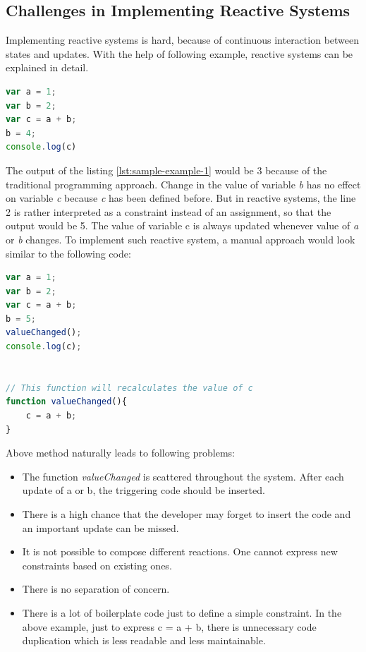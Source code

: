 \subsection {Challenges in Implementing Reactive Systems}
Implementing reactive systems is hard, because of continuous interaction between states and updates. With the help of following example, reactive systems can be explained in detail.

\begin{lstlisting}[language=JavaScript, caption=Sample example 1, label={lst:sample-example-1}]
var a = 1;
var b = 2;
var c = a + b;
b = 4;
console.log(c)
\end{lstlisting}
The output of the listing \ref{lst:sample-example-1} would be 3 because of the traditional programming approach. Change in the value of variable \textit{b} has no effect on variable \textit{c} because \textit{c} has been defined before. But in reactive systems, the line 2 is rather interpreted as a constraint instead of an assignment, so that the output would be 5. The value of variable c is always updated whenever value of \textit{a} or \textit{b} changes. 
To implement such reactive system, a manual approach would look similar to the following code:
\begin{lstlisting}[language=JavaScript, caption=Sample example 2, label={lst:sample-example-2}]
var a = 1;
var b = 2;
var c = a + b;
b = 5;
valueChanged();
console.log(c);


// This function will recalculates the value of c
function valueChanged(){
	c = a + b;
}
\end{lstlisting}
Above method naturally leads to following problems:

\begin{itemize}
	
	\item The function \textit{valueChanged} is scattered throughout the system. After each update of a or b, the triggering code should be inserted.
	\item There is a high chance that the developer may forget to insert the code and an important update can be missed.
	\item It is not possible to compose different reactions. One cannot express new constraints based on existing ones.
	\item There is no separation of concern.
	\item There is a lot of boilerplate code just to define a simple constraint. In the above example, just to express c = a + b, there is unnecessary code duplication which is less readable and less maintainable.
\end{itemize}
	
